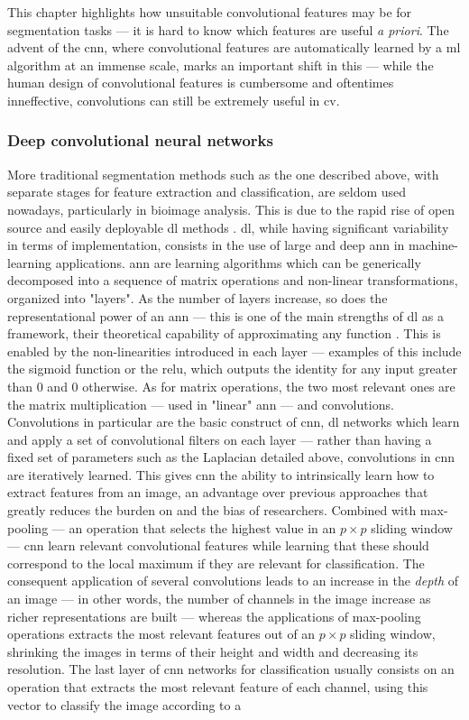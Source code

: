 This chapter highlights how unsuitable convolutional features may be for segmentation tasks --- it is hard to know which features are useful \textit{a priori}. The advent of the \ac{cnn}, where convolutional features are automatically learned by a \ac{ml} algorithm at an immense scale, marks an important shift in this --- while the human design of convolutional features is cumbersome and oftentimes inneffective, convolutions can still be extremely useful in \ac{cv}. 

\subsubsection{Deep convolutional neural networks}

More traditional segmentation methods such as the one described above, with separate stages for feature extraction and classification, are seldom used nowadays, particularly in bioimage analysis. This is due to the rapid rise of open source and easily deployable \ac{dl} methods \cite{Lucas2021-hc}. \Ac{dl}, while having significant variability in terms of implementation, consists in the use of large and deep \ac{ann} in machine-learning applications. \Ac{ann} are learning algorithms which can be generically decomposed into a sequence of matrix operations and non-linear transformations, organized into "layers". As the number of layers increase, so does the representational power of an \ac{ann} --- this is one of the main strengths of \ac{dl} as a framework, their theoretical capability of approximating any function \cite{Nielsen2015-wn}. This is enabled by the non-linearities introduced in each layer --- examples of this include the sigmoid function or the \ac{relu}, which outputs the identity for any input greater than $0$ and $0$ otherwise. As for matrix operations, the two most relevant ones are the matrix multiplication --- used in "linear" \ac{ann} --- and convolutions. Convolutions in particular are the basic construct of \ac{cnn}, \ac{dl} networks which learn and apply a set of convolutional filters on each layer --- rather than having a fixed set of parameters such as the Laplacian detailed above, convolutions in \ac{cnn} are iteratively learned. This gives \ac{cnn} the ability to intrinsically learn how to extract features from an image, an advantage over previous approaches that greatly reduces the burden on and the bias of researchers. Combined with max-pooling --- an operation that selects the highest value in an $p \times p$ sliding window --- \ac{cnn} learn relevant convolutional features while learning that these should correspond to the local maximum if they are relevant for classification. The consequent application of several convolutions leads to an increase in the \textit{depth} of an image --- in other words, the number of channels in the image increase as richer representations are built --- whereas the applications of max-pooling operations extracts the most relevant features out of an $p \times p$ sliding window, shrinking the images in terms of their height and width and decreasing its resolution. The last layer of \ac{cnn} networks for classification usually consists on an operation that extracts the most relevant feature of each channel, using this vector to classify the image according to a 